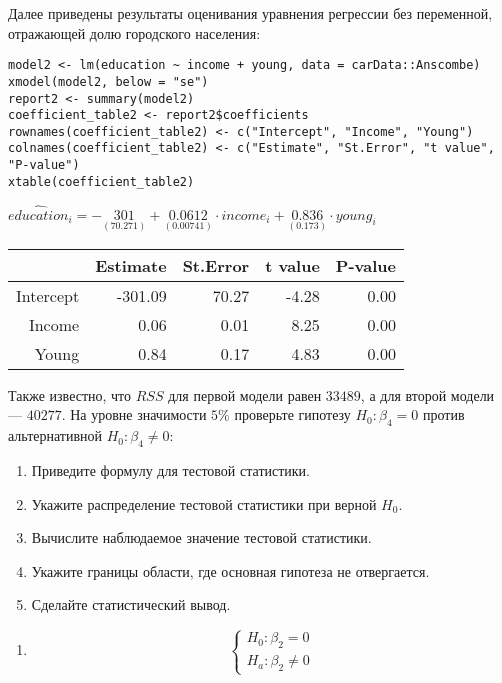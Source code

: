 \begin{problem}
\begin{enumerate}
Далее приведены результаты оценивания уравнения регрессии без переменной, отражающей долю городского населения:

\begin{verbatim}
model2 <- lm(education ~ income + young, data = carData::Anscombe)
xmodel(model2, below = "se")
report2 <- summary(model2)
coefficient_table2 <- report2$coefficients
rownames(coefficient_table2) <- c("Intercept", "Income", "Young")
colnames(coefficient_table2) <- c("Estimate", "St.Error", "t value", "P-value")
xtable(coefficient_table2)
\end{verbatim}


\begin{center}
\ensuremath{\widehat{education}_i=-\underset{( 70.271 )}{ 301 }+\underset{( 0.00741)}{0.0612}\cdot income_i+\underset{( 0.173)}{0.836}\cdot young_i}

\begin{tabular}{rrrrr}
  \hline
 & Estimate & St.Error & t value & P-value \\
  \hline
Intercept & -301.09 & 70.27 & -4.28 & 0.00 \\
  Income & 0.06 & 0.01 & 8.25 & 0.00 \\
  Young & 0.84 & 0.17 & 4.83 & 0.00 \\
   \hline
\end{tabular}

\end{center}
Также известно, что $RSS$ для первой модели равен $33489$, а для второй модели — $40277$. На уровне значимости $5\%$ проверьте гипотезу $H_0: \beta_4 = 0$ против альтернативной $H_0: \beta_4 \not= 0$:
\begin{enumerate}
\item Приведите формулу для тестовой статистики.
\item Укажите распределение тестовой статистики  при верной $H_0$.
\item Вычислите наблюдаемое значение тестовой статистики.
\item Укажите границы области, где основная гипотеза не отвергается.
\item Сделайте статистический вывод.
\end{enumerate}
\end{enumerate}


\begin{sol}
\begin{enumerate}
\item
\[
\begin{cases}
H_0: \beta_2=0\\
H_a: \beta_2\neq 0
\end{cases}
\]


\end{enumerate}
\end{sol}
\end{problem}
